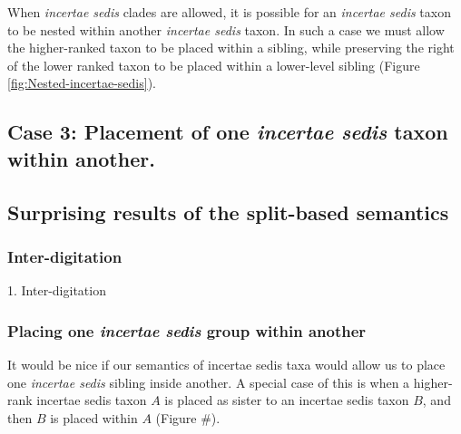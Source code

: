 \documentclass[english]{article}
\begin{document}
When \emph{incertae sedis} clades are allowed, it is possible for an
\emph{incertae sedis} taxon to be nested within another \emph{incertae
sedis} taxon.
In such a case we must allow the higher-ranked taxon to
be placed within a sibling, while preserving the right of the lower
ranked taxon to be placed within a lower-level sibling (Figure
\ref{fig:Nested-incertae-sedis}).


\subsection{Case 3: Placement of one \emph{incertae sedis} taxon within
another.}
\subsection{Surprising results of the split-based semantics}

\subsubsection{Inter-digitation}
1. Inter-digitation


\subsubsection{Placing one \emph{incertae sedis} group within another}
It would be nice if our semantics of incertae sedis taxa would allow us to place
one \emph{incertae sedis} sibling inside another.
A special case of
this is when a higher-rank incertae sedis taxon $A$ is placed as
sister to an incertae sedis taxon $B$, and then $B$ is placed within
$A$ (Figure \#).
\end{document}
